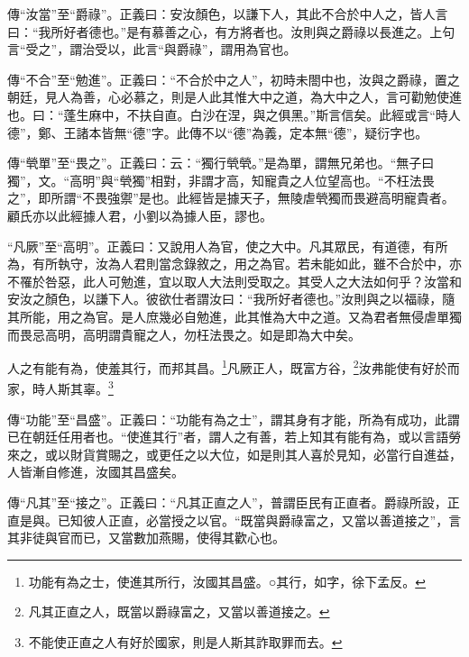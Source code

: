 {\noindent\zhuan{}\fzbyks 傳“汝當”至“爵祿”。正義曰：安汝顏色，以謙下人，其此不合於中人之，皆人言曰：“我所好者德也。”是有慕善之心，有方將者也。汝則與之爵祿以長進之。上句言“受之”，謂治受以，此言“與爵祿”，謂用為官也。 \par}

{\noindent\zhuan{}\fzbyks 傳“不合”至“勉進”。正義曰：“不合於中之人”，初時未閤中也，汝與之爵祿，置之朝廷，見人為善，心必慕之，則是人此其惟大中之道，為大中之人，言可勸勉使進也。曰：“蓬生麻中，不扶自直。白沙在涅，與之俱黑。”斯言信矣。此經或言“時人德”，鄭、王諸本皆無“德”字。此傳不以“德”為義，定本無“德”，疑衍字也。 \par}

{\noindent\zhuan{}\fzbyks 傳“煢單”至“畏之”。正義曰：云：“獨行煢煢。”是為單，謂無兄弟也。“無子曰獨”，文。“高明”與“煢獨”相對，非謂才高，知寵貴之人位望高也。“不枉法畏之”，即所謂“不畏強禦”是也。此經皆是據天子，無陵虐煢獨而畏避高明寵貴者。顧氏亦以此經據人君，小劉以為據人臣，謬也。 \par}

{\noindent\shu{}\fzkt “凡厥”至“高明”。正義曰：又說用人為官，使之大中。凡其眾民，有道德，有所為，有所執守，汝為人君則當念錄敘之，用之為官。若未能如此，雖不合於中，亦不罹於咎惡，此人可勉進，宜以取人大法則受取之。其受人之大法如何乎？汝當和安汝之顏色，以謙下人。彼欲仕者謂汝曰：“我所好者德也。”汝則與之以福祿，隨其所能，用之為官。是人庶幾必自勉進，此其惟為大中之道。又為君者無侵虐單獨而畏忌高明，高明謂貴寵之人，勿枉法畏之。如是即為大中矣。 \par}

人之有能有為，使羞其行，而邦其昌。\footnote{功能有為之士，使進其所行，汝國其昌盛。○其行，如字，徐下孟反。}凡厥正人，既富方谷，\footnote{凡其正直之人，既當以爵祿富之，又當以善道接之。}汝弗能使有好於而家，時人斯其辜。\footnote{不能使正直之人有好於國家，則是人斯其詐取罪而去。}


{\noindent\zhuan{}\fzbyks 傳“功能”至“昌盛”。正義曰：“功能有為之士”，謂其身有才能，所為有成功，此謂已在朝廷任用者也。“使進其行”者，謂人之有善，若上知其有能有為，或以言語勞來之，或以財貨賞賜之，或更任之以大位，如是則其人喜於見知，必當行自進益，人皆漸自修進，汝國其昌盛矣。 \par}

{\noindent\zhuan{}\fzbyks 傳“凡其”至“接之”。正義曰：“凡其正直之人”，普謂臣民有正直者。爵祿所設，正直是與。已知彼人正直，必當授之以官。“既當與爵祿富之，又當以善道接之”，言其非徒與官而已，又當數加燕賜，使得其歡心也。 \par}

